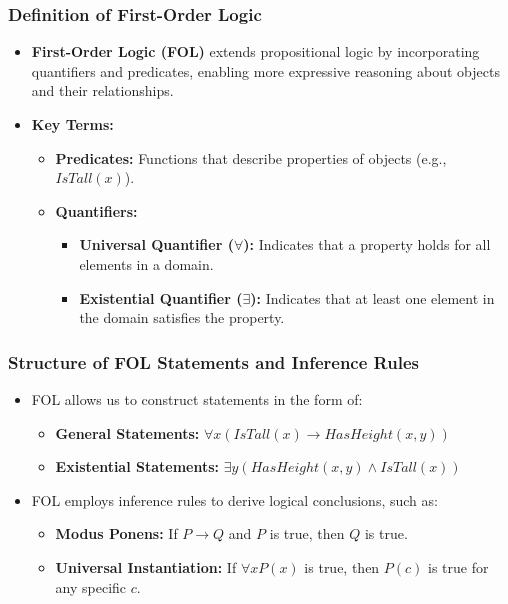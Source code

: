 \documentclass[aspectratio=169]{beamer}
\begin{document}
\begin{frame}[fragile]
    \frametitle{Definition of First-Order Logic}
    \begin{itemize}
        \item \textbf{First-Order Logic (FOL)} extends propositional logic by incorporating quantifiers and predicates, enabling more expressive reasoning about objects and their relationships.
        \item \textbf{Key Terms:}
        \begin{itemize}
            \item \textbf{Predicates:} Functions that describe properties of objects (e.g., $IsTall(x)$).
            \item \textbf{Quantifiers:}
            \begin{itemize}
                \item \textbf{Universal Quantifier ($\forall$):} Indicates that a property holds for all elements in a domain.
                \item \textbf{Existential Quantifier ($\exists$):} Indicates that at least one element in the domain satisfies the property.
            \end{itemize}
        \end{itemize}
    \end{itemize}
\end{frame}

\begin{frame}[fragile]
    \frametitle{Structure of FOL Statements and Inference Rules}
    \begin{itemize}
        \item FOL allows us to construct statements in the form of:
        \begin{itemize}
            \item \textbf{General Statements:} $\forall x (IsTall(x) \rightarrow HasHeight(x, y))$
            \item \textbf{Existential Statements:} $\exists y (HasHeight(x, y) \land IsTall(x))$
        \end{itemize}

        \item FOL employs inference rules to derive logical conclusions, such as:
        \begin{itemize}
            \item \textbf{Modus Ponens:} If $P \rightarrow Q$ and $P$ is true, then $Q$ is true.
            \item \textbf{Universal Instantiation:} If $\forall x P(x)$ is true, then $P(c)$ is true for any specific $c$.
        \end{itemize}
    \end{itemize}
\end{frame}
\end{document}
